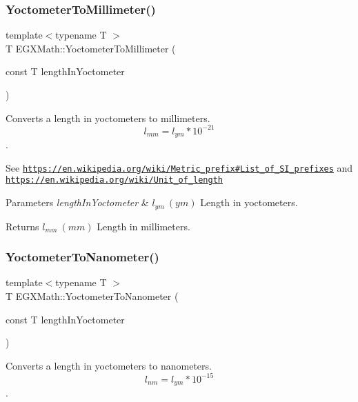 \subsubsection{\texorpdfstring{Yoctometer\+To\+Millimeter()}{YoctometerToMillimeter()}}
{\footnotesize\ttfamily template$<$typename T $>$ \\
T E\+G\+X\+Math\+::\+Yoctometer\+To\+Millimeter (\begin{DoxyParamCaption}\item[{const T}]{length\+In\+Yoctometer }\end{DoxyParamCaption})}



Converts a length in yoctometers to millimeters. \[ l_{mm}=l_{ym} * 10^{-21} \]. 

See \href{https://en.wikipedia.org/wiki/Metric_prefix#List_of_SI_prefixes}{\tt https\+://en.\+wikipedia.\+org/wiki/\+Metric\+\_\+prefix\#\+List\+\_\+of\+\_\+\+S\+I\+\_\+prefixes} and \href{https://en.wikipedia.org/wiki/Unit_of_length}{\tt https\+://en.\+wikipedia.\+org/wiki/\+Unit\+\_\+of\+\_\+length} 
\begin{DoxyParams}{Parameters}
{\em length\+In\+Yoctometer} & $ l_{ym}\ (ym)$ Length in yoctometers. \\
\hline
\end{DoxyParams}
\begin{DoxyReturn}{Returns}
$ l_{mm}\ (mm)$ Length in millimeters. 
\end{DoxyReturn}
\mbox{\label{group___e_g_x_math-_conversions-_length_conversions-_s_i-_yoctometer-_s_i_ga209906b099f04d26a1487bedcac4f65d}} 
\subsubsection{\texorpdfstring{Yoctometer\+To\+Nanometer()}{YoctometerToNanometer()}}
{\footnotesize\ttfamily template$<$typename T $>$ \\
T E\+G\+X\+Math\+::\+Yoctometer\+To\+Nanometer (\begin{DoxyParamCaption}\item[{const T}]{length\+In\+Yoctometer }\end{DoxyParamCaption})}



Converts a length in yoctometers to nanometers. \[ l_{nm}=l_{ym} * 10^{-15} \]. 

